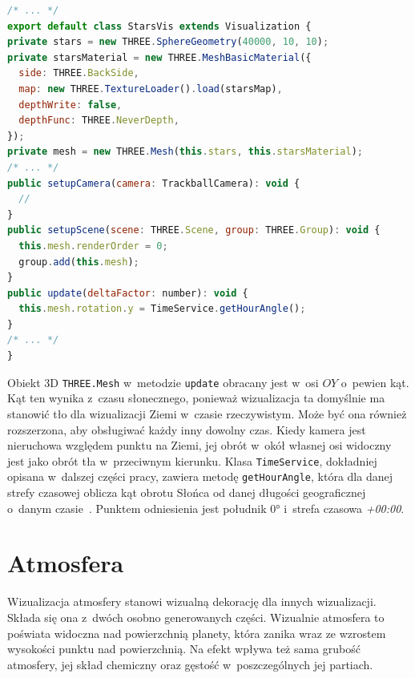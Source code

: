 \begin{lstlisting}[float, language=javascript, label={lst:starsVis}, caption={
  Fragmenty klasy \texttt{StarsVis}}
]
/* ... */
export default class StarsVis extends Visualization {
private stars = new THREE.SphereGeometry(40000, 10, 10);
private starsMaterial = new THREE.MeshBasicMaterial({
  side: THREE.BackSide,
  map: new THREE.TextureLoader().load(starsMap),
  depthWrite: false,
  depthFunc: THREE.NeverDepth,
});
private mesh = new THREE.Mesh(this.stars, this.starsMaterial);
/* ... */
public setupCamera(camera: TrackballCamera): void {
  //
}
public setupScene(scene: THREE.Scene, group: THREE.Group): void {
  this.mesh.renderOrder = 0;
  group.add(this.mesh);
}
public update(deltaFactor: number): void {
  this.mesh.rotation.y = TimeService.getHourAngle();
}
/* ... */
}
\end{lstlisting}

Obiekt 3D \texttt{THREE.Mesh} w~metodzie \texttt{update} obracany jest w~osi $OY$ o~pewien kąt. Kąt ten wynika z~czasu słonecznego, ponieważ wizualizacja ta domyślnie ma stanowić tło dla wizualizacji Ziemi w~czasie rzeczywistym. Może być ona również rozszerzona, aby obsługiwać każdy inny dowolny czas. Kiedy kamera jest nieruchowa względem punktu na Ziemi, jej obrót w~okół własnej osi widoczny jest jako obrót tła w~przeciwnym kierunku. Klasa \texttt{TimeService}, dokładniej opisana w~dalszej części pracy, zawiera metodę \texttt{getHourAngle}, która dla danej strefy czasowej oblicza kąt obrotu Słońca od danej długości geograficznej o~danym czasie~\cite{SolarTime}. Punktem odniesienia jest południk $\ang{0}$ i~strefa czasowa \textit{+00:00}. 

\section{Atmosfera}

Wizualizacja atmosfery stanowi wizualną dekorację dla innych wizualizacji. Składa się ona z~dwóch osobno generowanych części. Wizualnie atmosfera to poświata widoczna nad powierzchnią planety, która zanika wraz ze wzrostem wysokości punktu nad powierzchnią. Na efekt wpływa też sama grubość atmosfery, jej skład chemiczny oraz gęstość w~poszczególnych jej partiach.

